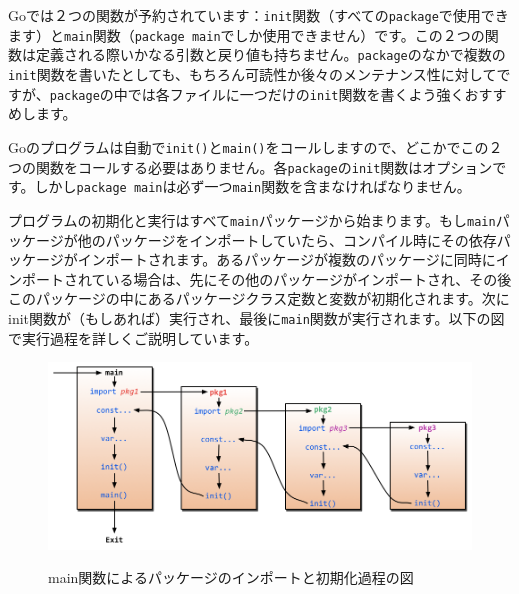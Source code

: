 Goでは２つの関数が予約されています：\texttt{init}関数（すべての\texttt{package}で使用できます）と\texttt{main}関数（\texttt{package main}でしか使用できません）です。この２つの関数は定義される際いかなる引数と戻り値も持ちません。\texttt{package}のなかで複数の\texttt{init}関数を書いたとしても、もちろん可読性か後々のメンテナンス性に対してですが、\texttt{package}の中では各ファイルに一つだけの\texttt{init}関数を書くよう強くおすすめします。

Goのプログラムは自動で\texttt{init()}と\texttt{main()}をコールしますので、どこかでこの２つの関数をコールする必要はありません。各\texttt{package}の\texttt{init}関数はオプションです。しかし\texttt{package main}は必ず一つ\texttt{main}関数を含まなければなりません。

プログラムの初期化と実行はすべて\texttt{main}パッケージから始まります。もし\texttt{main}パッケージが他のパッケージをインポートしていたら、コンパイル時にその依存パッケージがインポートされます。あるパッケージが複数のパッケージに同時にインポートされている場合は、先にその他のパッケージがインポートされ、その後このパッケージの中にあるパッケージクラス定数と変数が初期化されます。次にinit関数が（もしあれば）実行され、最後に\texttt{main}関数が実行されます。以下の図で実行過程を詳しくご説明しています。

\begin{figure}[H]
  \includegraphics[width=14cm]{2.3.init.png}
   \label{図2.6}
   \caption{main関数によるパッケージのインポートと初期化過程の図}
\end{figure}
